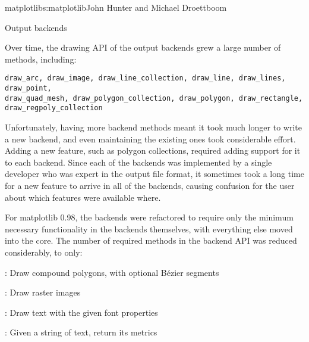 \begin{aosachapter}{matplotlib}{s:matplotlib}{John Hunter and Michael Droettboom}

\begin{aosasect1}{Output backends}


Over time, the drawing API of the output backends grew a large number
of methods, including:

\begin{verbatim}
draw_arc, draw_image, draw_line_collection, draw_line, draw_lines, draw_point,
draw_quad_mesh, draw_polygon_collection, draw_polygon, draw_rectangle,
draw_regpoly_collection
\end{verbatim}

Unfortunately, having more backend methods meant it took much longer
to write a new backend, and even maintaining the existing ones took
considerable effort.  Adding a new feature, such as polygon
collections, required adding support for it to each backend.  Since
each of the backends was implemented by a single developer who was
expert in the output file format, it sometimes took a long time for a
new feature to arrive in all of the backends, causing confusion for
the user about which features were available where.

For matplotlib 0.98, the backends were refactored to require only the
minimum necessary functionality in the backends themselves, with
everything else moved into the core.  The number of required methods
in the backend API was reduced considerably, to only:

\begin{aosaitemize}

  \item {}: Draw compound polygons, with optional
    B\'ezier segments

  \item {}: Draw raster images

  \item {}: Draw text with the given font properties

  \item {}: Given a string of
    text, return its metrics

\end{aosaitemize}


\end{aosasect1}
\end{aosachapter}
